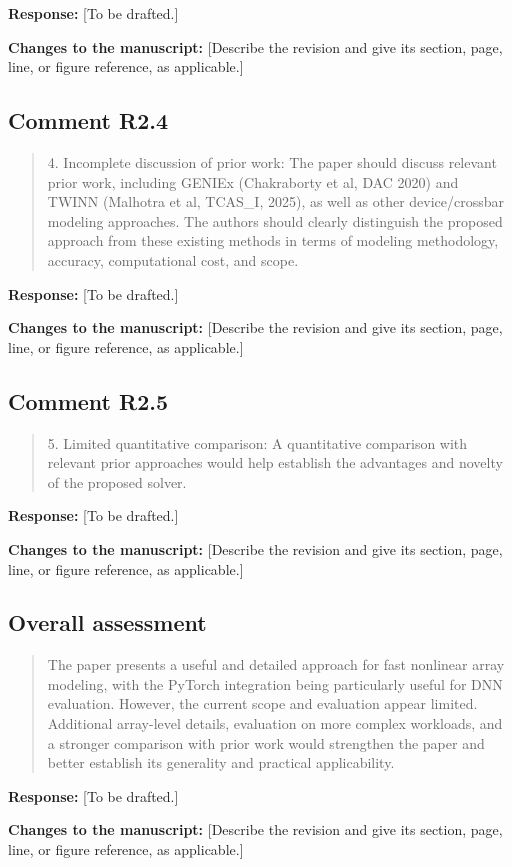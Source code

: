\documentclass[11pt,a4paper]{article}
\newenvironment{reviewercomment}
  {\begin{quote}\small\color{reviewerblue}}
  {\end{quote}}
\newcommand{\placeholder}[1]{[#1]}
\begin{document}
\noindent\textbf{Response:}
\placeholder{To be drafted.}

\noindent\textbf{Changes to the manuscript:}
\placeholder{Describe the revision and give its section, page, line, or figure reference, as applicable.}

\subsection*{Comment R2.4}
\begin{reviewercomment}
4. Incomplete discussion of prior work: The paper should discuss relevant
prior work, including GENIEx (Chakraborty et al, DAC 2020) and TWINN
(Malhotra et al, TCAS\_I, 2025), as well as other device/crossbar modeling
approaches. The authors should clearly distinguish the proposed approach
from these existing methods in terms of modeling methodology, accuracy,
computational cost, and scope.
\end{reviewercomment}

\noindent\textbf{Response:}
\placeholder{To be drafted.}

\noindent\textbf{Changes to the manuscript:}
\placeholder{Describe the revision and give its section, page, line, or figure reference, as applicable.}

\subsection*{Comment R2.5}
\begin{reviewercomment}
5. Limited quantitative comparison: A quantitative comparison with
relevant prior approaches would help establish the advantages and
novelty of the proposed solver.
\end{reviewercomment}

\noindent\textbf{Response:}
\placeholder{To be drafted.}

\noindent\textbf{Changes to the manuscript:}
\placeholder{Describe the revision and give its section, page, line, or figure reference, as applicable.}

\subsection*{Overall assessment}
\begin{reviewercomment}
The paper presents a useful and detailed approach for fast nonlinear
array modeling, with the PyTorch integration being particularly useful
for DNN evaluation. However, the current scope and evaluation appear
limited. Additional array-level details, evaluation on more complex
workloads, and a stronger comparison with prior work would strengthen
the paper and better establish its generality and practical applicability.
\end{reviewercomment}

\noindent\textbf{Response:}
\placeholder{To be drafted.}

\noindent\textbf{Changes to the manuscript:}
\placeholder{Describe the revision and give its section, page, line, or figure reference, as applicable.}
\end{document}
